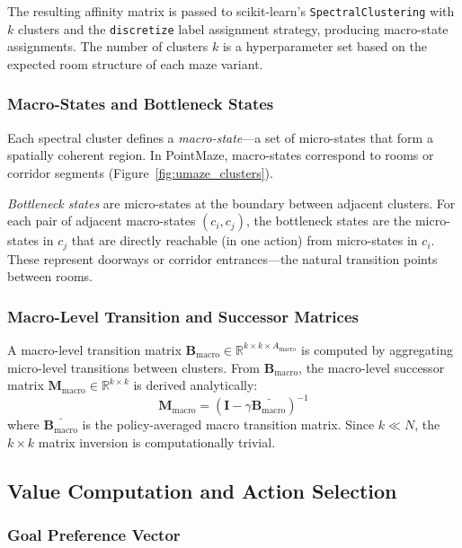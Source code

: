 \documentclass[11pt,a4paper]{article}
\newcommand{\M}{\mathbf{M}}
\newcommand{\B}{\mathbf{B}}
\newcommand{\I}{\mathbf{I}}
\newcommand{\Mmacro}{\M_{\text{macro}}}
\newcommand{\Bmacro}{\B_{\text{macro}}}
\newcommand{\R}{\mathbb{R}}
\begin{document}
The resulting affinity matrix is passed to scikit-learn's \texttt{SpectralClustering} with $k$ clusters and the \texttt{discretize} label assignment strategy, producing macro-state assignments.
The number of clusters $k$ is a hyperparameter set based on the expected room structure of each maze variant.

\subsubsection{Macro-States and Bottleneck States}

Each spectral cluster defines a \emph{macro-state}---a set of micro-states that form a spatially coherent region.
In PointMaze, macro-states correspond to rooms or corridor segments (Figure~\ref{fig:umaze_clusters}).

\emph{Bottleneck states} are micro-states at the boundary between adjacent clusters.
For each pair of adjacent macro-states $(c_i, c_j)$, the bottleneck states are the micro-states in $c_j$ that are directly reachable (in one action) from micro-states in $c_i$.
These represent doorways or corridor entrances---the natural transition points between rooms.

\subsubsection{Macro-Level Transition and Successor Matrices}

A macro-level transition matrix $\Bmacro \in \R^{k \times k \times A_{\text{macro}}}$ is computed by aggregating micro-level transitions between clusters.
From $\Bmacro$, the macro-level successor matrix $\Mmacro \in \R^{k \times k}$ is derived analytically:
\begin{equation}
    \Mmacro = (\I - \gamma \bar{\Bmacro})^{-1}
\end{equation}
where $\bar{\Bmacro}$ is the policy-averaged macro transition matrix.
Since $k \ll N$, the $k \times k$ matrix inversion is computationally trivial.

\subsection{Value Computation and Action Selection}
\label{sec:value_action}

\subsubsection{Goal Preference Vector}
\end{document}
